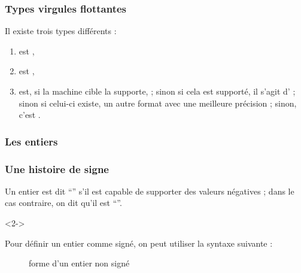 \documentclass{cppcourses}
\begin{document}
\begin{frame}

\frametitle{Types virgules flottantes}

Il existe trois types différents :

\begin{enumerate}
    \item {} est ,
    \item<2->  est ,
    \item<3->  est, si la machine cible la supporte,  ; sinon si cela est supporté, il s'agit d' ; sinon si celui-ci existe, un autre format avec une meilleure précision ; sinon, c'est .
\end{enumerate}


\end{frame}

\subsubsection{Les entiers}

\begin{frame}

\frametitle{Une histoire de signe}

Un entier est dit \enquote{} s'il est capable de supporter des valeurs négatives ; dans le cas contraire, on dit qu'il est \enquote{}.

\begin{uncoverenv}<2->

Pour définir un entier comme signé, on peut utiliser la syntaxe suivante :

\begin{figure}
\caption{forme d'un entier non signé}
\end{figure}

\end{uncoverenv}


\end{frame}
\end{document}
